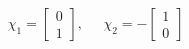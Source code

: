 \begin{equation}
\chi _{1}=\left[ 
\begin{array}{c}
0 \\ 
1
\end{array}
\right] ,\;\;\;\;\;\chi _{2}=-\left[ 
\begin{array}{c}
1 \\ 
0
\end{array}
\right]
\end{equation}

